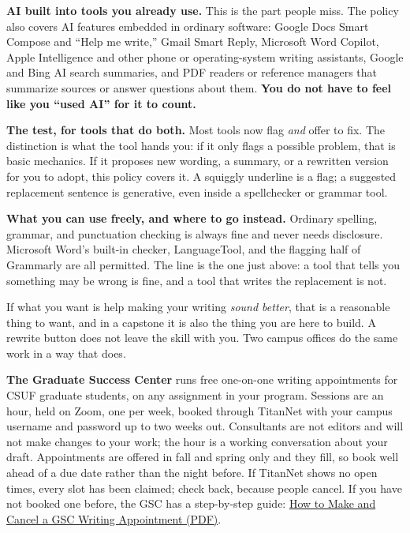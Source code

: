 \documentclass[11pt]{article}     %
\begin{document}
\noindent \textbf{AI built into tools you already use.} This is the part people miss. The policy also covers AI features embedded in ordinary software: Google Docs Smart Compose and ``Help me write,'' Gmail Smart Reply, Microsoft Word Copilot, Apple Intelligence and other phone or operating-system writing assistants, Google and Bing AI search summaries, and PDF readers or reference managers that summarize sources or answer questions about them. \textbf{You do not have to feel like you ``used AI'' for it to count.}

\vspace{0.5em}
\noindent \textbf{The test, for tools that do both.} Most tools now flag \emph{and} offer to fix. The distinction is what the tool hands you: if it only flags a possible problem, that is basic mechanics. If it proposes new wording, a summary, or a rewritten version for you to adopt, this policy covers it. A squiggly underline is a flag; a suggested replacement sentence is generative, even inside a spellchecker or grammar tool.

\vspace{0.5em}
\noindent \textbf{What you can use freely, and where to go instead.} Ordinary spelling, grammar, and punctuation checking is always fine and never needs disclosure. Microsoft Word's built-in checker, LanguageTool, and the flagging half of Grammarly are all permitted. The line is the one just above: a tool that tells you something may be wrong is fine, and a tool that writes the replacement is not.

\vspace{0.5em}
\noindent If what you want is help making your writing \emph{sound better}, that is a reasonable thing to want, and in a capstone it is also the thing you are here to build. A rewrite button does not leave the skill with you. Two campus offices do the same work in a way that does.

\vspace{0.5em}
\noindent \textbf{The Graduate Success Center} runs free one-on-one writing appointments for CSUF graduate students, on any assignment in your program. Sessions are an hour, held on Zoom, one per week, booked through TitanNet with your campus username and password up to two weeks out. Consultants are not editors and will not make changes to your work; the hour is a working conversation about your draft. Appointments are offered in fall and spring only and they fill, so book well ahead of a due date rather than the night before. If TitanNet shows no open times, every slot has been claimed; check back, because people cancel. If you have not booked one before, the GSC has a step-by-step guide: \href{https://www.fullerton.edu/graduate/_resources/pdfs/gsc/GSC-Writing-Appointment-Guide-041526.pdf}{How to Make and Cancel a GSC Writing Appointment (PDF)}.
\end{document}
